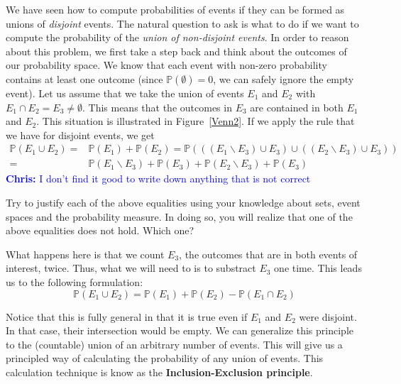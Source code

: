 \documentclass[a4paper,11pt,leqno]{report}
\newcommand{\chris}[1]{ \textcolor{blue}{\textbf{Chris:} #1}}
\begin{document}
We have seen how to compute probabilities of events if they can be formed as unions of \textit{disjoint}
events. The natural question to ask is what to do if we want to compute the probability of the \emph{union
of non-disjoint events}. In order to reason about this problem, we first take a step back and think about the
outcomes of our probability space. We know that each event with non-zero probability contains at least one outcome (since
$ \mathbb{P}(\emptyset) = 0 $, we can safely ignore the empty event). Let us assume that we take the union of events
$ E_{1} $ and $ E_{2} $ with $ E_{1} \cap E_{2} = E_{3} \not = \emptyset $. This means that the outcomes
in $ E_{3} $ are contained in both $ E_{1} $ and $ E_{2} $. This situation is illustrated in Figure~\ref{Venn2}. If we apply the rule that we have for disjoint events, we get 
\begin{align} \label{InExFalse}
\mathbb{P}(E_{1} \cup E_{2}) =& \mathbb{P}(E_{1}) + \mathbb{P}(E_{2})
= \mathbb{P}(((E_{1}\backslash E_{3}) \cup E_{3}) \cup ((E_{2}\backslash E_{3}) \cup E_{3})) \\
=& \mathbb{P}(E_{1}\backslash E_{3}) + \mathbb{P}(E_{3}) + \mathbb{P}(E_{2}\backslash E_{3}) \nonumber
+ \mathbb{P}(E_{3})
\end{align}
\chris{I don't find it good to write down anything that is not correct}

\begin{Exercise}
Try to justify each of the above equalities using your knowledge about sets, event spaces and the 
probability measure. In doing so, you will realize that one of the above equalities does not hold.
Which one? 
\end{Exercise}

What happens here is that we count $ E_{3} $, the outcomes that are in both events of interest, twice.
Thus, what we will need to is to substract $ E_{3} $ one time. This leads us to the following formulation:
\begin{equation}
\mathbb{P}(E_{1} \cup E_{2}) = \mathbb{P}(E_{1}) + \mathbb{P}(E_{2}) - \mathbb{P}(E_{1} \cap E_{2})
\end{equation}

Notice that this is fully general in that it is true even if $ E_{1} $ and $ E_{2} $ were disjoint. In that
case, their intersection would be empty. We can generalize this principle to the (countable) union of
an arbitrary number of events. This will give us a principled way of calculating the probability of any
union of events. This calculation technique is know as the \textbf{Inclusion-Exclusion principle}.
\end{document}
